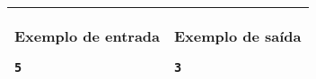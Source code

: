 \begin{table}[!h]
\centering
\begin{tabular}{|l|l|}
\hline
\begin{minipage}[t]{3in}
\textbf{Exemplo de entrada}
\begin{verbatim}
5
\end{verbatim}
\vspace{1mm}
\end{minipage}
&
\begin{minipage}[t]{3in}
\textbf{Exemplo de saída}
\begin{verbatim}
3
\end{verbatim}
\vspace{1mm}
\end{minipage} \\
\hline
\end{tabular}
\end{table}
